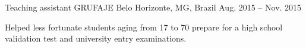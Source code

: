 \documentclass[11pt, a4paper]{awesome-cv}
\begin{document}
%
\begin{cvskills}
\end{cvskills}
%
\begin{cvskills}
\end{cvskills}
%
\begin{cventries}
	\cventry
	{Teaching assistant}
	{GRUFAJE}
	{Belo Horizonte, MG, Brazil}
	{Aug. 2015 – Nov. 2015}
	{
		\begin{cvitems}
			\item{ Helped less fortunate students aging from 17 to 70 prepare for a high school validation test and university entry examinations.}
		\end{cvitems}
	}
\end{cventries}
%
%
\end{document}
